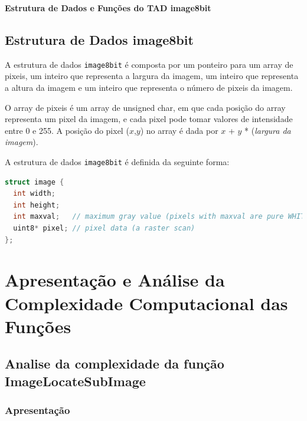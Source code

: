 \documentclass{report}
\begin{document}
\hfill

\hfill

\hfill

\hspace{-7mm}
{\LARGE\textbf{Estrutura de Dados e Funções do TAD image8bit}}

\section{Estrutura de Dados image8bit}

A estrutura de dados \texttt{image8bit} é composta por um ponteiro para um array de pixeis, um inteiro que representa a largura da imagem, um inteiro que representa a altura da imagem e um inteiro que representa o número de pixeis da imagem.
\par
O array de pixeis é um array de unsigned char, em que cada posição do array representa um pixel da imagem, e cada pixel pode tomar valores de intensidade entre 0 e 255. A posição do pixel (\(x\),\(y\)) no array é dada por \(x\) + \(y\) * (\textit{largura da imagem}).
\par
A estrutura de dados \texttt{image8bit} é definida da seguinte forma:

\begin{lstlisting}[language=C]
struct image {
  int width;
  int height;
  int maxval;   // maximum gray value (pixels with maxval are pure WHITE)
  uint8* pixel; // pixel data (a raster scan)
};
\end{lstlisting}




\chapter{Apresentação e Análise da Complexidade Computacional das Funções}

\section{Analise da complexidade da função ImageLocateSubImage}
\subsection{Apresentação}
\end{document}
